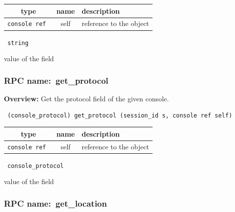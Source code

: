 
 
\vspace{0.3cm}
\begin{tabular}{|c|c|p{7cm}|}
 \hline
{\bf type} & {\bf name} & {\bf description} \\ \hline
{\tt console ref } & self & reference to the object \\ \hline 

\end{tabular}

\vspace{0.3cm}

{\tt 
string
}


value of the field
\vspace{0.3cm}
\vspace{0.3cm}
\vspace{0.3cm}
\subsubsection{RPC name:~get\_protocol}

{\bf Overview:} 
Get the protocol field of the given console.

\begin{verbatim} (console_protocol) get_protocol (session_id s, console ref self)\end{verbatim}



 
\vspace{0.3cm}
\begin{tabular}{|c|c|p{7cm}|}
 \hline
{\bf type} & {\bf name} & {\bf description} \\ \hline
{\tt console ref } & self & reference to the object \\ \hline 

\end{tabular}

\vspace{0.3cm}

{\tt 
console\_protocol
}


value of the field
\vspace{0.3cm}
\vspace{0.3cm}
\vspace{0.3cm}
\subsubsection{RPC name:~get\_location}

